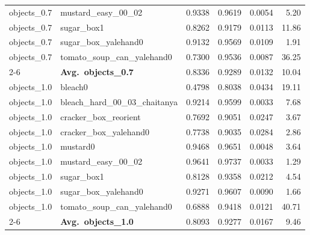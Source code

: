 \begin{longtable}{llrrrr}
  objects_0.7 & mustard\_easy\_00\_02 & 0.9338 & 0.9619 & 0.0054 & 5.20 \\
  objects_0.7 & sugar\_box1 & 0.8262 & 0.9179 & 0.0113 & 11.86 \\
  objects_0.7 & sugar\_box\_yalehand0 & 0.9132 & 0.9569 & 0.0109 & 1.91 \\
  objects_0.7 & tomato\_soup\_can\_yalehand0 & 0.7300 & 0.9536 & 0.0087 & 36.25 \\
  \cmidrule{2-6}
  & \textbf{Avg.~objects_0.7} & 0.8336 & 0.9289 & 0.0132 & 10.04 \\
  \midrule
  objects_1.0 & bleach0 & 0.4798 & 0.8038 & 0.0434 & 19.11 \\
  objects_1.0 & bleach\_hard\_00\_03\_chaitanya & 0.9214 & 0.9599 & 0.0033 & 7.68 \\
  objects_1.0 & cracker\_box\_reorient & 0.7692 & 0.9051 & 0.0247 & 3.67 \\
  objects_1.0 & cracker\_box\_yalehand0 & 0.7738 & 0.9035 & 0.0284 & 2.86 \\
  objects_1.0 & mustard0 & 0.9468 & 0.9651 & 0.0048 & 3.64 \\
  objects_1.0 & mustard\_easy\_00\_02 & 0.9641 & 0.9737 & 0.0033 & 1.29 \\
  objects_1.0 & sugar\_box1 & 0.8128 & 0.9358 & 0.0212 & 4.54 \\
  objects_1.0 & sugar\_box\_yalehand0 & 0.9271 & 0.9607 & 0.0090 & 1.66 \\
  objects_1.0 & tomato\_soup\_can\_yalehand0 & 0.6888 & 0.9418 & 0.0121 & 40.71 \\
  \cmidrule{2-6}
  & \textbf{Avg.~objects_1.0} & 0.8093 & 0.9277 & 0.0167 & 9.46 \\
  \midrule
\bottomrule
\end{longtable}